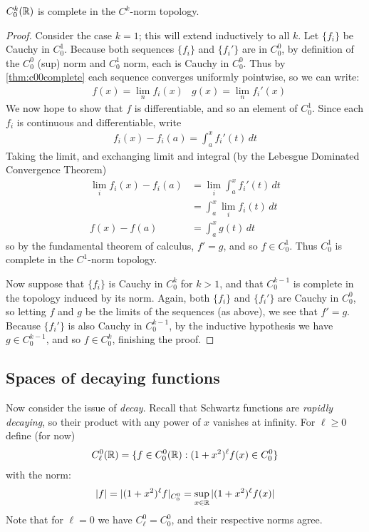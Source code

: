       \begin{thm}
        \label{thm:ck0complete}
        $C^k_0(\mathbb{R})$ is complete in the $C^k$-norm topology.
      \end{thm}
      \begin{proof}
        Consider the case $k=1$; this will extend inductively to all $k$.
        Let $\{f_i\}$ be Cauchy in $C^1_0$.
        Because both sequences $\{f_i\}$ and $\{f_i'\}$ are in $C^0_0$, by definition of the $C^0_0$ (sup) norm and $C^1_0$ norm, each is Cauchy in $C^0_0$.
        Thus by \cref{thm:c00complete} each sequence converges uniformly pointwise, so we can write:
        \begin{align*}
          &f(x)=\lim_n f_i(x) &g(x)=\lim_n f_i'(x)
        \end{align*}
        We now hope to show that $f$ is differentiable, and so an element of $C^1_0$.
        Since each $f_i$ is continuous and differentiable, write
        \begin{align*}
          f_i(x)-f_i(a) = \int_a^x f_i'(t)\,dt
        \end{align*}
        Taking the limit, and exchanging limit and integral (by the Lebesgue Dominated Convergence Theorem)
        \begin{align*}
          \lim_i f_i(x)-f_i(a) &= \lim_i\int_a^x f_i'(t)\,dt\\
          &= \int_a^x\lim_if_i(t)\,dt\\
          f(x)-f(a) &= \int_a^x g(t)\,dt
        \end{align*}
        so by the fundamental theorem of calculus, $f'=g$, and so $f\in C^1_0$.
        Thus $C^1_0$ is complete in the $C^1$-norm topology.

        Now suppose that $\{f_i\}$ is Cauchy in $C^k_0$ for $k>1$, and that $C^{k-1}_0$ is complete in the topology induced by its norm.
        Again, both $\{f_i\}$ and $\{f_i'\}$ are Cauchy in $C^0_0$, so letting $f$ and $g$ be the limits of the sequences (as above), we see that $f'=g$.
        Because $\{f_i'\}$ is also Cauchy in $C^{k-1}_0$, by the inductive hypothesis we have $g\in C^{k-1}_0$, and so $f\in C^k_0$, finishing the proof.
      \end{proof}

    \subsection{Spaces of decaying functions}
      \label{sec:decayfunc}
      Now consider the issue of \emph{decay}.
      Recall that Schwartz functions are \emph{rapidly decaying}, so their product with any power of $x$ vanishes at infinity.
      For $\ell\ge0$ define (for now)
      \begin{align*}
        C^0_\ell(\mathbb{R}) = \{f\in C^0_0(\mathbb{R}):(1+x^2)^\ell f(x)\in C^0_0\}
      \end{align*}
      with the norm:
      \begin{align*}
        |f| = |(1+x^2)^\ell f|_{C^0_0} = \sup_{x\in\mathbb{R}} |(1+x^2)^\ell f(x)|
      \end{align*}
      Note that for $\ell=0$ we have $C^0_\ell=C^0_0$, and their respective norms agree.

